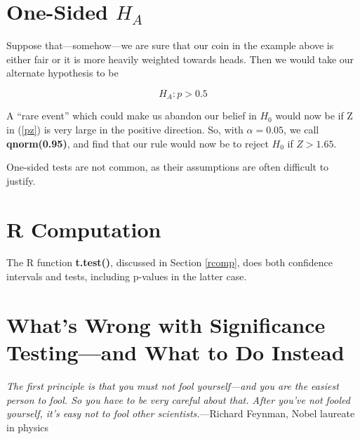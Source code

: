 \section{One-Sided $H_A$}

Suppose that---somehow---we are sure that our coin in the example above
is either fair or it is more heavily weighted towards heads.  Then we
would take our alternate hypothesis to be

\begin{equation}
\label{onesideha}
H_A: p > 0.5
\end{equation}

A ``rare event'' which could make us abandon our belief in $H_0$ would
now be if Z in (\ref{pz}) is very large in the positive direction.  So,
with $\alpha = 0.05$, we call {\bf qnorm(0.95)}, and find that our rule
would now be to reject $H_0$ if $Z > 1.65$.

One-sided tests are not common, as their assumptions are often difficult
to justify.

% 
% 
% 
% 
% 

\section{R Computation}

The R function {\bf t.test()}, discussed in Section \ref{rcomp}, does
both confidence intervals and tests, including p-values in the latter
case.

\section{What's Wrong with Significance Testing---and What to Do Instead}
\label{whatswrong}

{\it 
The first principle is that you must not fool yourself---and you are
the easiest person to fool. So you have to be very careful about
that. After you've not fooled yourself, it's easy not to fool other
scientists.}---Richard Feynman, Nobel laureate in physics

